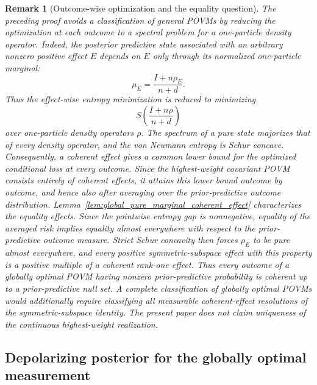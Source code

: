 \documentclass[journal]{IEEEtran}
\newtheorem{remark}[theorem]{Remark}
\begin{document}
\begin{remark}[Outcome-wise optimization and the equality question] The preceding proof avoids a classification of general POVMs by reducing the optimization at each outcome to a spectral problem for a one-particle density operator. Indeed, the posterior predictive state associated with an arbitrary nonzero positive effect \(E\) depends on \(E\) only through its normalized one-particle marginal: \[ \mu_E=\frac{I+n\rho_E}{n+d}. \] Thus the effect-wise entropy minimization is reduced to minimizing \[ S\!\left(\frac{I+n\rho}{n+d}\right) \] over one-particle density operators \(\rho\). The spectrum of a pure state majorizes that of every density operator, and the von Neumann entropy is Schur concave. Consequently, a coherent effect gives a common lower bound for the optimized conditional loss at every outcome. Since the highest-weight covariant POVM consists entirely of coherent effects, it attains this lower bound outcome by outcome, and hence also after averaging over the prior-predictive outcome distribution. Lemma~\ref{lem:global_pure_marginal_coherent_effect} characterizes the equality effects.  Since the pointwise entropy gap is nonnegative, equality of the averaged risk implies equality almost everywhere with respect to the prior-predictive outcome measure.  Strict Schur concavity then forces \(\rho_E\) to be pure almost everywhere, and every positive symmetric-subspace effect with this property is a positive multiple of a coherent rank-one effect.  Thus every outcome of a globally optimal POVM having nonzero prior-predictive probability is coherent up to a prior-predictive null set. A complete classification of globally optimal POVMs would additionally require classifying all measurable coherent-effect resolutions of the symmetric-subspace identity. The present paper does not claim uniqueness of the continuous highest-weight realization. 
\end{remark}

\subsection{Depolarizing posterior for the globally optimal measurement}
\label{subsec:global_explicit_alpha_beta_tau}
\end{document}
